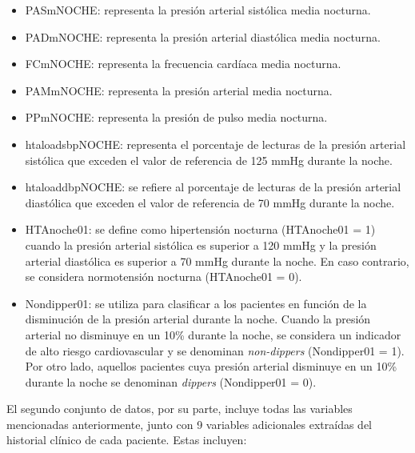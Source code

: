 \begin{itemize}
  \item PASmNOCHE: representa la presión arterial sistólica media nocturna.
  \item PADmNOCHE: representa la presión arterial diastólica media nocturna.
  \item FCmNOCHE: representa la frecuencia cardíaca media nocturna.
	\item PAMmNOCHE: representa la presión arterial media nocturna.
	\item PPmNOCHE: representa la presión de pulso media nocturna.
  \item htaloadsbpNOCHE: representa el porcentaje de lecturas de la presión arterial sistólica que exceden el valor de referencia de 125 mmHg durante la noche.
  \item htaloaddbpNOCHE: se refiere al porcentaje de lecturas de la presión arterial diastólica que exceden el valor de referencia de 70 mmHg durante la noche.
  \item HTAnoche01: se define como hipertensión nocturna (HTAnoche01 = 1) cuando la presión arterial sistólica es superior a 120 mmHg y la presión arterial diastólica es superior a 70 mmHg durante la noche. En caso contrario, se considera normotensión nocturna (HTAnoche01 = 0).
  \item Nondipper01: se utiliza para clasificar a los pacientes en función de la disminución de la presión arterial durante la noche. Cuando la presión arterial no disminuye en un 10\% durante la noche, se considera un indicador de alto riesgo cardiovascular y se denominan \emph{non-dippers} (Nondipper01 = 1). Por otro lado, aquellos pacientes cuya presión arterial disminuye en un 10\% durante la noche se denominan \emph{dippers} (Nondipper01 = 0).
\end{itemize}


El segundo conjunto de datos, por su parte, incluye todas las variables mencionadas anteriormente, junto con
9 variables adicionales extraídas del historial clínico de cada paciente. Estas incluyen:

